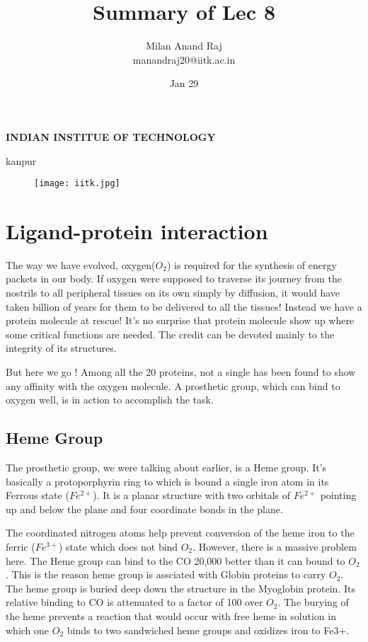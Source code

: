 \documentclass[12pt]{article}
\title{Summary of Lec 8}
\author{Milan Anand Raj\\manandraj20@iitk.ac.in}
\date{Jan 29}
\begin{document}
\NoBgThispage
\maketitle



\begin{center}
\textbf{INDIAN INSTITUE OF TECHNOLOGY}

kanpur
\end{center}


\vfill
\begin{figure}
\centering
\texttt{[image: iitk.jpg]}
\end{figure}
\clearpage
\tableofcontents
\clearpage
\NoBgThispage
\section{Ligand-protein interaction}
The way we have evolved, oxygen($O_{2}$) is required for the synthesis of energy packets in our body. If oxygen were supposed to traverse its journey from the nostrils to all peripheral tissues on its own simply by diffusion, it would have taken billion of years for them to be delivered to all the tissues! Instead we have a protein molecule at rescue! It's no surprise that protein molecule show up where some critical functions are needed. The credit can be devoted mainly to the integrity of its structures.

But here we go ! Among all the 20 proteins, not a single has been found to show any affinity with the oxygen molecule. A prosthetic group, which can bind to oxygen well, is in action to accomplish the task.


\subsection{Heme Group}
The prosthetic group, we were talking about earlier, is a Heme group. It's basically a protoporphyrin ring to which is bound a single iron atom in its Ferrous state ($Fe^{2+}$). It is a planar structure with two orbitals of $Fe^{2+}$ pointing up and below the plane and four coordinate bonds in the plane.

The coordinated nitrogen atoms help prevent conversion of the heme iron to the ferric ($Fe^{3+}$) state which does not bind $O_{2}$.
However, there is a massive problem here. The Heme group can bind to the CO 20,000 better than it can bound to $O_{2}$. This is the reason heme group is assciated with Globin proteins to carry $O_{2}$. The heme group is buried deep down the structure in the Myoglobin protein. Its relative binding to CO is attenuated to a factor of 100 over $O_{2}$. The burying of the heme prevents a reaction that would occur with free heme in solution in which one $O_{2}$ binds to two sandwiched heme groups and oxidizes iron to Fe3+.
\clearpage
\end{document}

